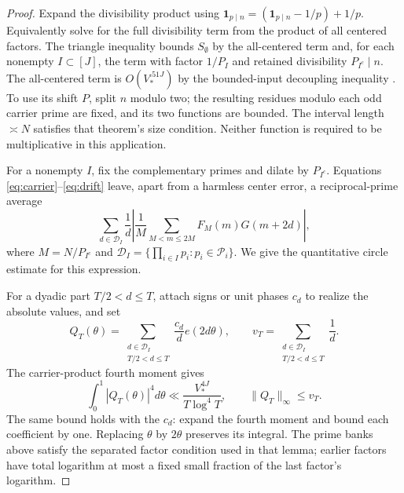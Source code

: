 \documentclass[11pt]{article}
\theoremstyle{remark}\newtheorem{remark}[theorem]{Remark}
\newcommand{\one}{\mathbf 1}
\newcommand{\Dcal}{\mathcal D}
\newcommand{\cP}{\mathcal P}
\begin{document}
\begin{proof}
Expand the divisibility product using
$\one_{p\mid n}=(\one_{p\mid n}-1/p)+1/p$.
Equivalently solve for the full divisibility term from the product of
all centered factors. The triangle inequality bounds $S_{\emptyset}$
by the all-centered term and, for each nonempty $I\subset[J]$, the term
with factor $1/P_I$ and retained divisibility $P_{I^c}\mid n$.
The all-centered term is $O(V_*^{.51J})$ by the bounded-input
decoupling inequality \cite[Theorem 3.3]{tt}. To use its shift $P$,
split $n$ modulo two; the resulting residues modulo each odd carrier
prime are fixed, and its two functions are bounded. The interval
length $\asymp N$ satisfies that theorem's size condition. Neither
function is required to be multiplicative in this application.

For a nonempty $I$, fix the complementary primes and dilate by
$P_{I^c}$. Equations \eqref{eq:carrier}--\eqref{eq:drift} leave,
apart from a harmless center error, a reciprocal-prime average
\begin{equation}\label{eq:circle-target}
 \sum_{d\in\Dcal_I}\frac1d
 \left|\frac1M\sum_{M<m\le2M}F_M(m)G(m+2d)\right|,
\end{equation}
where $M=N/P_{I^c}$ and $\Dcal_I=\{\prod_{i\in I}p_i:p_i\in\cP_i\}$.
We give the quantitative circle estimate for this expression.

For a dyadic part $T/2<d\le T$, attach signs or unit phases $c_d$
to realize the absolute values, and set
\[
 Q_T(\theta)=\sum_{\substack{d\in\Dcal_I\\T/2<d\le T}}
                     \frac{c_d}{d}e(2d\theta),\qquad
 v_T=\sum_{\substack{d\in\Dcal_I\\T/2<d\le T}}\frac1d.
\]
The carrier-product fourth moment \cite[Lemma C.2]{pilatte} gives
\begin{equation}\label{eq:Q4}
 \int_0^1|Q_T(\theta)|^4d\theta
                  \ll\frac{V_*^{4J}}{T\log^4T},\qquad
 \|Q_T\|_\infty\le v_T.
\end{equation}
The same bound holds with the $c_d$: expand the fourth moment and
bound each coefficient by one. Replacing $\theta$ by $2\theta$
preserves its integral. The prime banks above satisfy the separated
factor condition used in that lemma; earlier factors have total
logarithm at most a fixed small fraction of the last factor's logarithm.


\end{proof}
\end{document}
